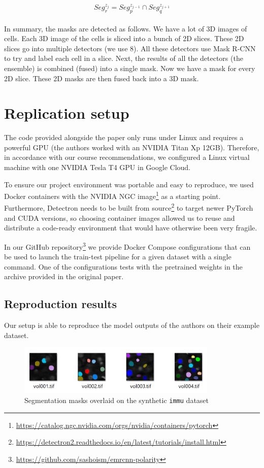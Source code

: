 \documentclass[a4]{article}
\begin{document}
\[Seg_r^{z_j} = Seg_p^{z_{j-1}}\cap Seg_q^{z_{j + 1}} \]\\


In summary, the masks are detected as follows. We have a lot of 3D images of cells. Each 3D image of the cells is sliced into a bunch of 2D slices. These 2D slices go into multiple detectors (we use 8). All these detectors use Mask R-CNN to try and label each cell in a slice. Next, the results of all the detectors (the ensemble) is combined (fused) into a single mask. Now we have a mask for every 2D slice. These 2D masks are then fused back into a 3D mask.

\section{Replication setup}

The code provided alongside the paper only runs under Linux and requires a powerful GPU (the authors worked with an NVIDIA Titan Xp 12GB). Therefore, in accordance with our course recommendations, we configured a Linux virtual machine with one NVIDIA Tesla T4 GPU in Google Cloud.

To ensure our project environment was portable and easy to reproduce, we used Docker containers with the NVIDIA NGC image\footnote{\url{https://catalog.ngc.nvidia.com/orgs/nvidia/containers/pytorch}} as a starting point. Furthermore, Detectron needs to be built from source\footnote{\url{https://detectron2.readthedocs.io/en/latest/tutorials/install.html}} to target newer PyTorch and CUDA versions, so choosing container images allowed us to reuse and distribute a code-ready environment that would have otherwise been very fragile.

In our GitHub repository\footnote{\url{https://github.com/sashoism/emrcnn-polarity}} we provide Docker Compose configurations that can be used to launch the train-test pipeline for a given dataset with a single command. One of the configurations tests with the pretrained weights in the archive provided in the original paper.

\subsection{Reproduction results}

Our setup is able to reproduce the model outputs of the authors on their example dataset.

\begin{figure}[h!]
    \centering
    \includegraphics[width=0.85\textwidth]{figures/emrcnn-immu.png}
    \caption{Segmentation masks overlaid on the synthetic \texttt{immu} dataset}
    \label{fig:emrcnn-immu}
\end{figure}
\end{document}
